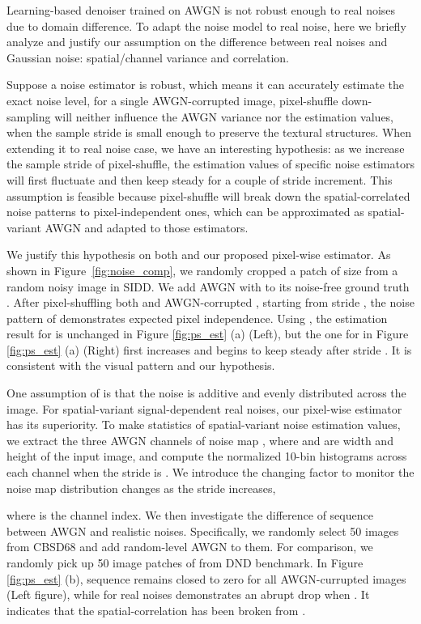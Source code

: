 \documentclass[letterpaper]{article} \usepackage{aaai20}  \usepackage{times}  \usepackage{helvet} \usepackage{courier}  \usepackage{comment}
\begin{document}
Learning-based denoiser trained on AWGN is not robust enough to real noises due to domain difference. To adapt the noise model to real noise, here we briefly analyze and justify our assumption on the difference between real noises and Gaussian noise: spatial/channel variance and correlation. 

Suppose a noise estimator is robust, which means it can accurately estimate the exact noise level, for a single AWGN-corrupted image, pixel-shuffle down-sampling will neither influence the AWGN variance nor the estimation values, when the sample stride is small enough to preserve the textural structures. When extending it to real noise case, we have an interesting hypothesis: as we increase the sample stride of pixel-shuffle, the estimation values of specific noise estimators will first fluctuate and then keep steady for a couple of stride increment. This assumption is feasible because pixel-shuffle will break down the spatial-correlated noise patterns to pixel-independent ones, which can be approximated as spatial-variant AWGN and adapted to those estimators. 

We justify this hypothesis on both \cite{liu2013single} and our proposed pixel-wise estimator. As shown in Figure~\ref{fig:noise_comp}, we randomly cropped a patch of size  from a random noisy image  in SIDD\cite{abdelhamed2018high}. We add AWGN with  to its noise-free ground truth . After pixel-shuffling both  and AWGN-corrupted , starting from stride , the noise pattern of  demonstrates expected pixel independence. Using \cite{liu2013single}, the estimation result for  is unchanged in Figure \ref{fig:ps_est} (a) (Left), but the one for  in Figure \ref{fig:ps_est} (a) (Right) first increases and begins to keep steady after stride . It is consistent with the visual pattern and our hypothesis.

One assumption of \cite{liu2013single} is that the noise is additive and evenly distributed across the image. For spatial-variant signal-dependent real noises, our pixel-wise estimator has its superiority. To make statistics of spatial-variant noise estimation values, we extract the three AWGN channels of noise map , where  and  are width and height of the input image, and compute the normalized 10-bin histograms  across each channel when the stride is . We introduce the changing factor  to monitor the noise map distribution changes as the stride  increases,   

where  is the channel index. We then investigate the difference of  sequence between AWGN and realistic noises. Specifically, we randomly select 50 images from CBSD68 \cite{roth2009fields} and add random-level AWGN to them. For comparison, we randomly pick up 50 image patches of  from DND benchmark. In Figure \ref{fig:ps_est} (b),  sequence remains closed to zero for all AWGN-currupted images (Left figure), while for real noises  demonstrates an abrupt drop when . It indicates that the spatial-correlation has been broken from . 
\end{document}
